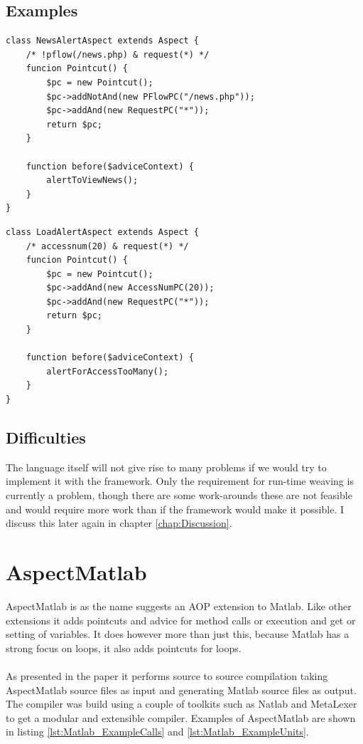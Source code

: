 \documentclass[a4paper]{report}
\begin{document}
\section{Examples}
\begin{lstlisting}[caption=An advice to alert the user to check the newspage.,label=lst:AOWP_ExampleNews]
class NewsAlertAspect extends Aspect {
	/* !pflow(/news.php) & request(*) */	
	funcion Pointcut() {
		$pc = new Pointcut();
		$pc->addNotAnd(new PFlowPC("/news.php"));
		$pc->addAnd(new RequestPC("*"));
		return $pc;
	}
	
	function before($adviceContext) {
		alertToViewNews();
	}
}
\end{lstlisting}
\begin{lstlisting}[caption=An advice that alerts on heavy load.,label=lst:AOWP_ExampleLoad]
class LoadAlertAspect extends Aspect {
	/* accessnum(20) & request(*) */	
	funcion Pointcut() {
		$pc = new Pointcut();
		$pc->addAnd(new AccessNumPC(20));
		$pc->addAnd(new RequestPC("*"));
		return $pc;
	}
	
	function before($adviceContext) {
		alertForAccessTooMany();
	}
}
\end{lstlisting}
\section{Difficulties}
The language itself will not give rise to many problems if we would try to implement it with the framework. Only the requirement for run-time weaving is currently a problem, though there are some work-arounds these are not feasible and would require more work than if the framework would make it possible. I discuss this later again in chapter \ref{chap:Discussion}.

\chapter{AspectMatlab}
AspectMatlab \cite{aslam_aspectmatlab:_2010} is as the name suggests an AOP extension to Matlab. Like other extensions it adds pointcuts and advice for method calls or execution and get or setting of variables. It does however more than just this, because Matlab has a strong focus on loops, it also adds pointcuts for loops.\\
\\
As presented in the paper it performs source to source compilation taking AspectMatlab source files as input and generating Matlab source files as output. The compiler was build using a couple of toolkits such as Natlab and MetaLexer to get a modular and extensible compiler. Examples of AspectMatlab are shown in listing \ref{lst:Matlab_ExampleCalls} and \ref{lst:Matlab_ExampleUnits}.
\end{document}
